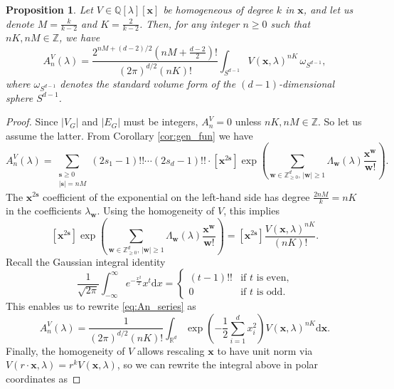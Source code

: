 \documentclass[10pt,a4paper]{amsart}
\newtheorem{proposition}{Proposition}
\newcommand{\QQ}{\mathbb{Q}}
\newcommand{\RR}{\mathbb{R}}
\newcommand{\ZZ}{\mathbb{Z}}
\newcommand{\bb}[1]{\boldsymbol{#1}}
\renewcommand{\d}{\mathrm{d}}
\begin{document}
\begin{proposition}
  \label{prop:An_exp_integral}
  Let $V\in \QQ[\lambda][\bb{x}]$ be homogeneous of degree $k$ in $\bb{x}$, and let us denote $M = \tfrac{k}{k-2}$ and $K = \tfrac{2}{k-2}$. Then, for any integer $n\geq 0$ such that $nK,nM\in\ZZ$, we have
  \begin{equation}
    \label{eq:An_exp_integral}
    A^V_n (\lambda) = \frac{2^{nM + (d-2)/2} \left(nM +\frac{d-2}{2}\right)!}{(2\pi)^{d/2} (nK)!} \int_{S^{d-1}} V(\bb{x},\lambda)^{nK} \,\omega_{S^{d-1}},
  \end{equation}
  where $\omega_{S^{d-1}}$ denotes the standard volume form of the $(d-1)$-dimensional sphere $S^{d-1}$.
\end{proposition}

\begin{proof}
  Since $|V_G|$ and $|E_G|$ must be integers, $A^V_n = 0$ unless $nK,nM\in\ZZ$. So let us assume the latter. From Corollary \ref{cor:gen_fun} we have 
  \begin{equation}
    \label{eq:An_series}
    A^V_n(\lambda) = \sum_{\substack{\bb{s} \geq 0 \\ |\bb{s}| = nM}} (2s_1-1)!!\cdots (2s_d-1)!!\cdot [\bb{x}^{2\bb{s}}]\exp\left( \sum_{\bb{w}\in \ZZ^d_{\geq 0},\, |\bb{w}| \geq 1} \Lambda_{\bb{w}}(\lambda) \frac{\bb{x}^{\bb{w}}}{\bb{w}!} \right).
  \end{equation}
  The $\bb{x}^{2\bb{s}}$ coefficient of the exponential on the left-hand side has degree $\tfrac{2nM}{k} = nK$ in the coefficients $\lambda_{\bb{w}}$. Using the homogeneity of $V$, this implies
  \[
    [\bb{x}^{2\bb{s}}]\exp\left( \sum_{\bb{w}\in \ZZ^d_{\geq 0},\, |\bb{w}| \geq 1} \Lambda_{\bb{w}}(\lambda) \frac{\bb{x}^{\bb{w}}}{\bb{w}!} \right) = [\bb{x}^{2\bb{s}}] \frac{V(\bb{x},\lambda)^{nK}}{(nK)!}.
  \]
  Recall the Gaussian integral identity
  \[
    \frac{1}{\sqrt{2\pi}} \int_{-\infty}^{\infty} e^{-\frac{x^2}{2}} x^t \d x = \left\{ \begin{array}{ll}
      (t-1)!! & \text{if } t \text{ is even,} \\
      0 & \text{if } t \text{ is odd.}
    \end{array} \right.
  \]
  This enables us to rewrite \eqref{eq:An_series} as 
  \[
    A^V_n(\lambda) = \frac{1}{(2\pi)^{d/2} (nK)!} \int_{\RR^d} \exp\left( -\frac{1}{2} \sum_{i=1}^{d} x_i^2 \right) V(\bb{x},\lambda)^{nK} \d\bb{x}.
  \]
  Finally, the homogeneity of $V$ allows rescaling $\bb{x}$ to have unit norm via $V(r\cdot \bb{x},\lambda) = r^k V(\bb{x},\lambda)$, so we can rewrite the integral above in polar coordinates as

\end{proof}
\end{document}
